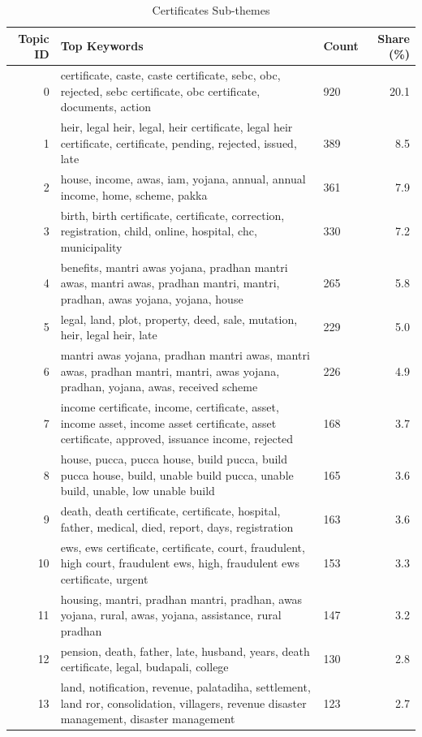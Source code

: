 \begin{table}[htbp]
\centering
\caption{Certificates Sub-themes}
\label{tab:topics_Certificates}
\begin{tabular}{rlp{7cm}r}
\toprule
Topic ID & Top Keywords & Count & Share (\%) \\
\midrule
0 & certificate, caste, caste certificate, sebc, obc, rejected, sebc certificate, obc certificate, documents, action & 920 & 20.1 \\
1 & heir, legal heir, legal, heir certificate, legal heir certificate, certificate, pending, rejected, issued, late & 389 & 8.5 \\
2 & house, income, awas, iam, yojana, annual, annual income, home, scheme, pakka & 361 & 7.9 \\
3 & birth, birth certificate, certificate, correction, registration, child, online, hospital, chc, municipality & 330 & 7.2 \\
4 & benefits, mantri awas yojana, pradhan mantri awas, mantri awas, pradhan mantri, mantri, pradhan, awas yojana, yojana, house & 265 & 5.8 \\
5 & legal, land, plot, property, deed, sale, mutation, heir, legal heir, late & 229 & 5.0 \\
6 & mantri awas yojana, pradhan mantri awas, mantri awas, pradhan mantri, mantri, awas yojana, pradhan, yojana, awas, received scheme & 226 & 4.9 \\
7 & income certificate, income, certificate, asset, income asset, income asset certificate, asset certificate, approved, issuance income, rejected & 168 & 3.7 \\
8 & house, pucca, pucca house, build pucca, build pucca house, build, unable build pucca, unable build, unable, low unable build & 165 & 3.6 \\
9 & death, death certificate, certificate, hospital, father, medical, died, report, days, registration & 163 & 3.6 \\
10 & ews, ews certificate, certificate, court, fraudulent, high court, fraudulent ews, high, fraudulent ews certificate, urgent & 153 & 3.3 \\
11 & housing, mantri, pradhan mantri, pradhan, awas yojana, rural, awas, yojana, assistance, rural pradhan & 147 & 3.2 \\
12 & pension, death, father, late, husband, years, death certificate, legal, budapali, college & 130 & 2.8 \\
13 & land, notification, revenue, palatadiha, settlement, land ror, consolidation, villagers, revenue disaster management, disaster management & 123 & 2.7 \\

\end{tabular}
\end{table}

